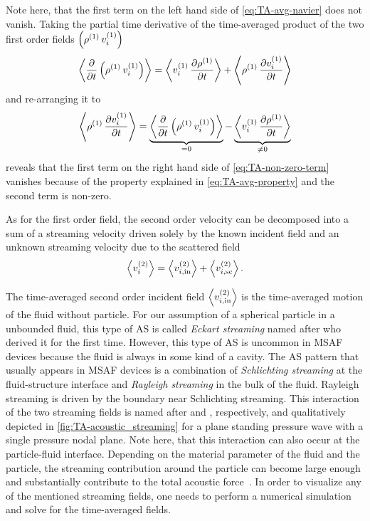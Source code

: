 Note here, that the first term on the left hand side of \cref{eq:TA-avg-navier} 
does not vanish. Taking the partial time derivative of the time-averaged 
product of the two first order fields 
$\left(\rho^{(1)}\,v_{i}^{(1)}\right)$
\begin{equation}
  \left\langle \pdv{t}\left( \rho^{(1)}\,v_{i}^{(1)} \right) \right\rangle
  =
  \left\langle v_{i}^{(1)}\,\pdv{  \rho^{(1)}  }{t} \right\rangle
  +
  \left\langle \rho^{(1)}\,\pdv{  v_{i}^{(1)}  }{t} \right\rangle
\end{equation}
and re-arranging it to
\begin{equation}
  \left\langle \rho^{(1)}\,\pdv{  v_{i}^{(1)}  }{t} \right\rangle
  =
  \underbrace{
  \left\langle \pdv{t}\left( \rho^{(1)}\,v_{i}^{(1)} \right) \right\rangle
}_{=0}
  -
  \underbrace{
  \left\langle v_{i}^{(1)}\,\pdv{  \rho^{(1)}  }{t} \right\rangle
}_{\neq 0}
  \label{eq:TA-non-zero-term}
\end{equation}
reveals that the first term on the right hand side of 
\cref{eq:TA-non-zero-term} vanishes because of the property explained in 
\cref{eq:TA-avg-property} and the second term is non-zero.

As for the first order field, the second order velocity can be decomposed into 
a sum of a streaming velocity driven solely by the known incident field and an 
unknown streaming velocity due to the scattered field
\begin{equation}
  \left\langle v_{i}^{(2)} \right\rangle =
    \left\langle v_{i,\mathrm{in}}^{(2)} \right\rangle +
    \left\langle v_{i,\mathrm{sc}}^{(2)} \right\rangle.
  \label{eq:TA-nd-velocity}
\end{equation}

The time-averaged second order incident field 
$\left\langle v_{i,\mathrm{in}}^{(2)} \right\rangle$ is the time-averaged motion of the 
fluid without particle. For our assumption of a spherical particle in a 
unbounded fluid, this type of AS is called \emph{Eckart streaming} named after 
 who derived it for the first time. However, this type of AS 
is uncommon in MSAF devices because the fluid is always in some kind of a 
cavity. The AS pattern that usually appears in MSAF devices is a combination of 
\emph{Schlichting streaming} at the fluid-structure interface and 
\emph{Rayleigh streaming} in the bulk of the fluid. Rayleigh streaming is 
driven by the boundary near Schlichting streaming. This interaction of the two 
streaming fields is named after  and 
, respectively, and qualitatively depicted in 
\cref{fig:TA-acoustic_streaming} for a plane standing pressure wave with a 
single pressure nodal plane. Note here, that this interaction can also occur at 
the particle-fluid interface. Depending on the material parameter of the fluid 
and the particle, the streaming contribution around the particle can become 
large enough and substantially contribute to the total acoustic 
force~\cite{Baasch2019}. In order to visualize any of the mentioned streaming 
fields, one needs to perform a numerical simulation and solve for the 
time-averaged fields.


